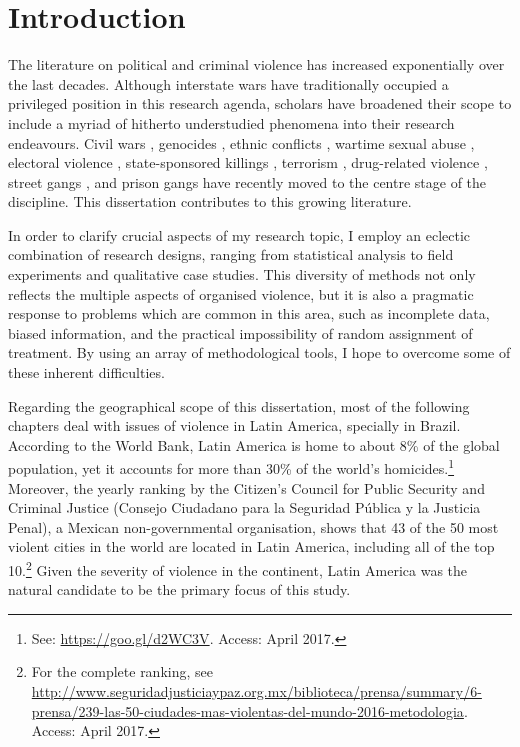 \chapter{Introduction}
\label{chap:intro}

The literature on political and criminal violence has increased exponentially over the last decades. Although interstate wars have traditionally occupied a privileged position in this research agenda, scholars have broadened their scope to include a myriad of hitherto understudied phenomena into their research endeavours. Civil wars \citep[][]{collier2004greed,fearon2003ethnicity,kalyvas2006logic}, genocides \citep[][]{mamdani2014victims, power2013problem}, ethnic conflicts \citep[][]{kaufmann1996possible, montalvo2005ethnic, sambanis2001ethnic}, wartime sexual abuse \citep[][]{cohen2013explaining,wood2006variation,wood2009armed}, electoral violence \citep[][]{hoglund2009electoral,wilkinson2006votes}, state-sponsored killings \citep[][]{harff1988toward, krain1997state,krain2005international,uzonyi2014unpacking}, terrorism \citep[][]{de2005quality,bueno2007propaganda,pape2003strategic}, drug-related violence \citep[][]{holmes2006drugs,lessing2015logics,richani2013systems, shirk2010drug}, street gangs \citep[][]{franzese2016youth,jones2009youth,rodgers2006living,sobel1987direct}, and prison gangs \citep[][]{dias2011pulverizaccao,freire2014,skarbek2011governance,skarbek2012prison,skarbek2014social} have recently moved to the centre stage of the discipline. This dissertation contributes to this growing literature.

In order to clarify crucial aspects of my research topic, I employ an eclectic combination of research designs, ranging from statistical analysis to field experiments and qualitative case studies. This diversity of methods not only reflects the multiple aspects of organised violence, but it is also a pragmatic response to problems which are common in this area, such as incomplete data, biased information, and the practical impossibility of random assignment of treatment. By using an array of methodological tools, I hope to overcome some of these inherent difficulties.

Regarding the geographical scope of this dissertation, most of the following chapters deal with issues of violence in Latin America, specially in Brazil. According to the World Bank, Latin America is home to about 8\% of the global population, yet it accounts for more than 30\% of the world's homicides.\footnote{See: \url{https://goo.gl/d2WC3V}. Access: April 2017.} Moreover, the yearly ranking by the Citizen's Council for Public Security and Criminal Justice (Consejo Ciudadano para la Seguridad Pública y la Justicia Penal), a Mexican non-governmental organisation, shows that 43 of the 50 most violent cities in the world are located in Latin America, including all of the top 10.\footnote{For the complete ranking, see \url{http://www.seguridadjusticiaypaz.org.mx/biblioteca/prensa/summary/6-prensa/239-las-50-ciudades-mas-violentas-del-mundo-2016-metodologia}. Access: April 2017.} Given the severity of violence in the continent, Latin America was the natural candidate to be the primary focus of this study.

